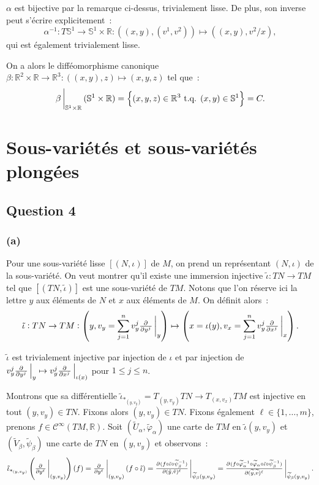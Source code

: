 \documentclass{article}
\newcommand{\R}{\mathbb R}
\begin{document}
$\alpha$ est bijective par la remarque ci-dessus, trivialement lisse. De plus, son inverse peut s'écrire explicitement~:
\[\alpha^{-1} : T\mathbb S^1 \to \mathbb S^1 \times \R : ((x, y), (v^1, v^2)) \mapsto ((x, y), v^2/x),\]
qui est également trivialement lisse.

On a alors le difféomorphisme canonique $\beta : \R^2 \times \R \to \R^3 : ((x, y), z) \mapsto (x, y, z)$ tel que~:
\[\beta\sVert[3]_{\mathbb S^1 \times \R}(\mathbb S^1 \times \R) = \left\{(x, y, z) \in \R^3 \text{ t.q. } (x, y) \in \mathbb S^1\right\} = C.\]

\section{Sous-variétés et sous-variétés plongées}
\subsection*{Question 4}
\subsubsection*{(a)}
Pour une sous-variété lisse $[(N, \iota)]$ de $M$, on prend un représentant $(N, \iota)$ de la sous-variété. On veut montrer qu'il existe une immersion injective
$\tilde \iota : TN \to TM$ tel que $[(TN, \tilde \iota)]$ est une sous-variété de $TM$. Notons que l'on réserve ici la lettre $y$ aux éléments de $N$ et $x$ aux
éléments de $M$. On définit alors~:
\[\tilde \iota : TN \to TM : \left(y, v_y = \sum_{j=1}^nv_y^j\pd {}{{y^j}}\sVert[3]_y\right) \mapsto \left(x = \iota(y), v_x = \sum_{j=1}^nv_y^j\pd {}{{x^j}}\sVert[3]_x\right).\]

$\tilde \iota$ est trivialement injective par injection de $\iota$ et par injection de $v_y^j\pd {}{{y^j}}\sVert[2]_y \mapsto v_y^j\pd {}{{x^j}}\sVert[2]_{\iota(x)}$
pour $1 \leq j \leq n$.

Montrons que sa différentielle $\tilde \iota_{*_{(y, v_y)}} = T_{(y, v_y)}TN \to T_{(x, v_x)}TM$ est injective en tout $(y, v_y) \in TN$. Fixons alors $(y, v_y) \in TN$.
Fixons également $\ell \in \{1, \ldots, m\}$, prenons $f \in \mathcal C^\infty(TM, \R)$. Soit $(\widetilde U_\alpha, \widetilde \varphi_\alpha)$ une carte de $TM$ en
$\tilde \iota(y, v_y)$ et $(\widetilde V_\beta, \widetilde \psi_\beta)$ une carte de $TN$ en $(y, v_y)$ et observons~:
\[
	\tilde \iota_{*_{(y, v_y)}}\left(\pd {}{{y^\ell}}\sVert[3]_{(y, v_y)}\right)(f) = \pd {}{{y^\ell}}\sVert[3]_{(y, v_y)}(f \circ \tilde \iota)
		= \pd {(f \circ \tilde \iota \circ \widetilde \psi_\beta^{-1})}{{(\tilde y, \tilde v)^\ell}}\sVert[3]_{\widetilde \psi_\beta(y, v_y)}
		= \pd {(f \circ \widetilde \varphi_\alpha^{-1} \circ \widetilde \varphi_\alpha \circ \tilde \iota \circ \widetilde \psi_\beta^{-1})}
			    	{{(\widetilde y, \widetilde v)^\ell}}\sVert[3]_{\widetilde \psi_\beta(y, v_y)}.
\]
\end{document}
